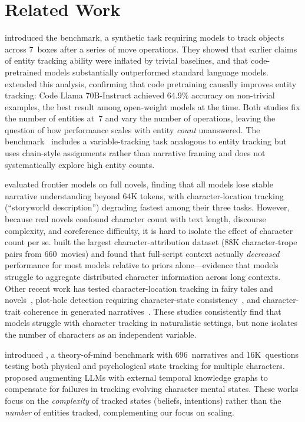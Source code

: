 \section{Related Work}
\label{sec:related}

\citet{kim2023entity} introduced the \boxes benchmark, a synthetic task requiring models to track objects across 7~boxes after a series of move operations.
They showed that earlier claims of entity tracking ability were inflated by trivial baselines, and that code-pretrained models substantially outperformed standard language models.
\citet{kim2024code} extended this analysis, confirming that code pretraining causally improves entity tracking: Code Llama 70B-Instruct achieved 64.9\% accuracy on non-trivial \boxes examples, the best result among open-weight models at the time.
Both studies fix the number of entities at~7 and vary the number of operations, leaving the question of how performance scales with entity \emph{count} unanswered.
The  benchmark~\citep{hsieh2024ruler} includes a variable-tracking task analogous to entity tracking but uses chain-style assignments rather than narrative framing and does not systematically explore high entity counts.

\citet{hamilton2025tldm} evaluated frontier models on full novels, finding that all models lose stable narrative understanding beyond 64K tokens, with character-location tracking (``storyworld description'') degrading fastest among their three tasks.
However, because real novels confound character count with text length, discourse complexity, and coreference difficulty, it is hard to isolate the effect of character count per se.
\citet{baruah2025chatter} built the largest character-attribution dataset (88K character-trope pairs from 660~movies) and found that full-script context actually \emph{decreased} performance for most models relative to priors alone---evidence that models struggle to aggregate distributed character information across long contexts.
Other recent work has tested character-location tracking in fairy tales and novels~\citep{locations2025}, plot-hole detection requiring character-state consistency~\citep{flawed2025}, and character-trait coherence in generated narratives~\citep{mary2025}.
These studies consistently find that models struggle with character tracking in naturalistic settings, but none isolates the number of characters as an independent variable.

\citet{xu2024opentom} introduced \opentom, a theory-of-mind benchmark with 696~narratives and 16K~questions testing both physical and psychological state tracking for multiple characters.
\citet{evolvtrip2025} proposed augmenting LLMs with external temporal knowledge graphs to compensate for failures in tracking evolving character mental states.
These works focus on the \emph{complexity} of tracked states (beliefs, intentions) rather than the \emph{number} of entities tracked, complementing our focus on scaling.

